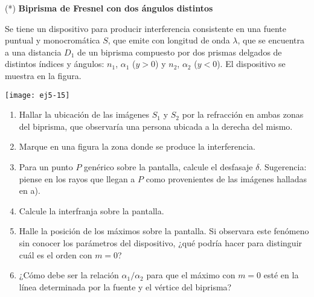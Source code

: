 \item 
(*) \textbf{Biprisma de Fresnel con dos ángulos distintos}\\
\begin{minipage}[t][3cm]{0.6\textwidth}
Se tiene un dispositivo para producir interferencia consistente en una fuente puntual y monocromática $S$, que emite con longitud de onda $\lambda$, que se encuentra a una distancia $D_1$ de un biprisma compuesto por dos prismas delgados de distintos índices y ángulos: $n_1$, $\alpha_1$ ($y>0$) y $n_2$, $\alpha_2$ ($y<0$).
El dispositivo se muestra en la figura.
\end{minipage}
\begin{minipage}[c][2.5cm][t]{0.35\textwidth}
	\texttt{[image: ej5-15]}
\end{minipage}
\begin{enumerate}
	\item Hallar la ubicación de las imágenes $S_1$ y $S_2$ por la refracción en ambas zonas del biprisma, que observaría una persona ubicada a la derecha del mismo. 
	\item Marque en una figura la zona donde se produce la interferencia.
	\item Para un punto $P$ genérico sobre la pantalla, calcule el desfasaje $\delta$. Sugerencia: piense en los rayos que llegan a $P$ como provenientes de las imágenes halladas en a).
	\item Calcule la interfranja sobre la pantalla. 
	\item Halle la posición de los máximos sobre la pantalla.
	Si observara este fenómeno sin conocer los parámetros del dispositivo, ¿qué podría hacer para distinguir cuál es el orden con $m = 0$? 
	\item ¿Cómo debe ser la relación $\alpha_1/\alpha_2$ para que el máximo con $m = 0$ esté en la línea determinada por la fuente y el vértice del biprisma?
\end{enumerate}
